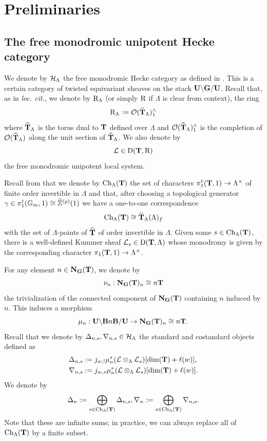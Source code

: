 \documentclass[article, 10pt, oneside, reqno]{amsart}
\theoremstyle{plain}
\theoremstyle{definition}
\theoremstyle{remark}
\begin{document}
\section{Preliminaries}

\subsection{The free monodromic unipotent Hecke category}\label{sec:free-mono-hecke}

We denote by $\mathcal{H}_{\Lambda}$ the free monodromic Hecke category as defined in \cite{BezrukavnikovYun, BezrukavnikovRicheSoergelTheory,Gouttard, EteveFreeMono}. This is a certain category of twisted equivariant sheaves on the stack $\mathbf{U} \backslash \mathbf{G} /\mathbf{U}$. Recall that, as in \emph{loc. cit.}, we denote by $\mathrm{R}_{\Lambda}$ (or simply $\mathrm{R}$ if $\Lambda$ is clear from context), the ring 
$$\mathrm{R}_{\Lambda} := \mathcal{O}(\widehat{\mathbf{T}}_{\Lambda})^{\wedge}_{1}$$
where $\widehat{\mathbf{T}}_{\Lambda}$ is the torus dual to $\mathbf{T}$ defined over $\Lambda$ and $\mathcal{O}(\widehat{\mathbf{T}}_{\Lambda})^{\wedge}_{1}$ is the completion of $\mathcal{O}(\widehat{\mathbf{T}}_{\Lambda})$ along the unit section of $\widehat{\mathbf{T}}_{\Lambda}$. We also denote by 
$$\mathcal{L} \in \mathrm{D}(\mathbf{T}, \mathrm{R})$$ 
the free monodromic unipotent local system. 

Recall from \cite{EteveJordan} that we denote by $\mathrm{Ch}_{\Lambda}(\mathbf{T})$ the set of characters $\pi_1^{t}(\mathbf{T}, 1) \to \Lambda^{\times}$ of finite order invertible in $\Lambda$ and that, after choosing a topological generator $\gamma \in \pi_1^t(\mathbb{G}_m, 1) \cong \widehat{\mathbb{Z}}^{(p)}(1)$ we have a one-to-one correspondence 
$$\mathrm{Ch}_{\Lambda}(\mathbf{T}) \cong \widehat{\mathbf{T}}_{\Lambda}(\Lambda)_{f}$$
with the set of $\Lambda$-points of $\widehat{\mathbf{T}}$ of order invertible in $\Lambda$. Given some $s \in \mathrm{Ch}_{\Lambda}(\mathbf{T})$, there is a well-defined Kummer sheaf $\mathcal{L}_s \in \mathrm{D}(\mathbf{T}, \Lambda)$ whose monodromy is given by the corresponding character $\pi_1(\mathbf{T}, 1) \to \Lambda^{\times}$.  

For any element $n \in \mathbf{N}_{\mathbf{G}}(\mathbf{T})$, we denote by 
$$\nu_n : \mathbf{N}_{\mathbf{G}}(\mathbf{T})_n \cong n\mathbf{T}$$
the trivialization of the connected component of $\mathbf{N}_{\mathbf{G}}(\mathbf{T})$ containing $n$ induced by $n$. This induces a morphism 
$$\mu_n : \mathbf{U} \backslash \mathbf{B} n \mathbf{B}/\mathbf{U} \to \mathbf{N}_{\mathbf{G}}(\mathbf{T})_n \cong n\mathbf{T}.$$
Recall that we denote by $\Delta_{n,s}, \nabla_{n,s} \in \mathcal{H}_{\Lambda}$ the standard and costandard objects defined as 
\begin{align*}
\Delta_{n,s} &:= j_{w,!}\mu_n^*(\mathcal{L} \otimes_{\Lambda} \mathcal{L}_s)[\dim(\mathbf{T}) + \ell(w)], \\
\nabla_{n,s} &:= j_{w,*}\mu_n^*(\mathcal{L} \otimes_{\Lambda} \mathcal{L}_s)[\dim(\mathbf{T}) + \ell(w)].
\end{align*}
We denote by 
$$\Delta_{n} := \bigoplus_{s \in \mathrm{Ch}_{\Lambda}(\mathbf{T})}\Delta_{n,s}, \nabla_{n} := \bigoplus_{s \in \mathrm{Ch}_{\Lambda}(\mathbf{T})}\nabla_{n,s}.$$
Note that these are infinite sums; in practice, we can always replace all of $\mathrm{Ch}_{\Lambda}(\mathbf{T})$ by a finite subset.  
\end{document}
